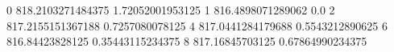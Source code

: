 0 818.2103271484375 1.72052001953125
1 816.4898071289062 0.0
2 817.2155151367188 0.7257080078125
4 817.0441284179688 0.5543212890625
6 816.84423828125 0.35443115234375
8 817.16845703125 0.67864990234375
